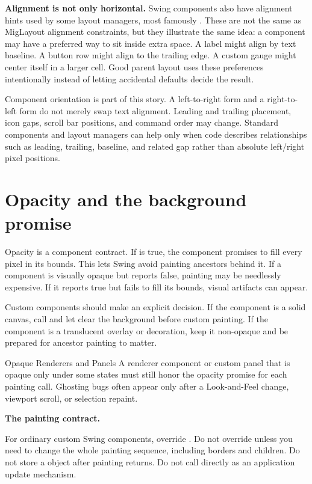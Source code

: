 \textbf{Alignment is not only horizontal.} Swing components also have alignment hints used by some layout managers, most
famously . These are not the same as MigLayout alignment
constraints, but they illustrate the same idea: a component may have a preferred
way to sit inside extra space. A label might align by text baseline. A button
row might align to the trailing edge. A custom gauge might center itself in a
larger cell. Good parent layout uses these preferences intentionally instead of
letting accidental defaults decide the result.

Component orientation is part of this story. A left-to-right form and a
right-to-left form do not merely swap text alignment. Leading and trailing
placement, icon gaps, scroll bar positions, and command order may change.
Standard components and layout managers can help only when code describes
relationships such as leading, trailing, baseline, and related gap rather than
absolute left/right pixel positions.

\section{Opacity and the background promise}

Opacity is a component contract. If  is true, the component promises to fill every pixel in its bounds. This lets Swing avoid painting ancestors behind it. If a component is visually opaque but reports false, painting may be needlessly expensive. If it reports true but fails to fill its bounds, visual artifacts can appear.

Custom components should make an explicit decision. If the component is a solid canvas, call  and let  clear the background before custom painting. If the component is a translucent overlay or decoration, keep it non-opaque and be prepared for ancestor painting to matter.

\begin{pitfallbox}{Opaque Renderers and Panels}
A renderer component or custom panel that is opaque only under some states must still honor the opacity promise for each painting call. Ghosting bugs often appear only after a Look-and-Feel change, viewport scroll, or selection repaint.
\end{pitfallbox}

\textbf{The painting contract.}

For ordinary custom Swing components, override . Do not override  unless you need to change the whole painting sequence, including borders and children. Do not store a  object after painting returns. Do not call  directly as an application update mechanism.

